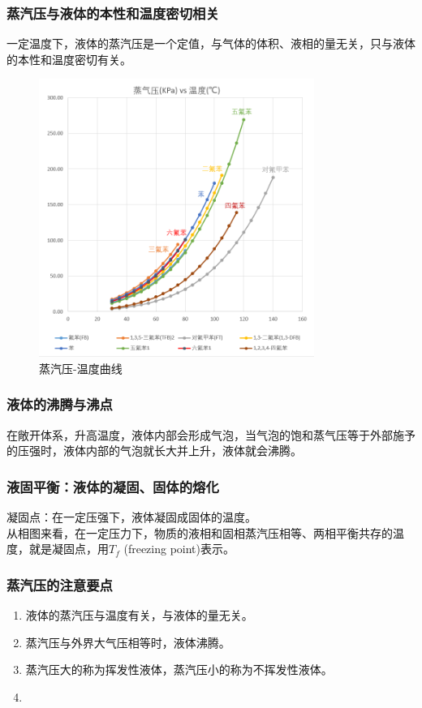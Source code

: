 \documentclass[12pt, a4paper, oneside]{ctexbook}
\begin{document}
\subsubsection*{蒸汽压与液体的本性和温度密切相关}
一定温度下，液体的蒸汽压是一个定值，与气体的体积、液相的量无关，只与液体的本性和温度密切有关。
\begin{figure}[htbp]
    \centering
    \includegraphics[width=0.8\textwidth]{pics/vapor_pressure.png}
    \caption{蒸汽压-温度曲线}
\end{figure}

\newpage
\subsubsection{液体的沸腾与沸点}
在敞开体系，升高温度，液体内部会形成气泡，当气泡的饱和蒸气压等于外部施予的压强时，液体内部的气泡就长大并上升，液体就会沸腾。\\
\subsubsection{液固平衡：液体的凝固、固体的熔化}
凝固点：在一定压强下，液体凝固成固体的温度。\\
从相图来看，在一定压力下，物质的液相和固相蒸汽压相等、两相平衡共存的温度，就是凝固点，用$T_f$ (freezing point)表示。\\

\subsubsection{蒸汽压的注意要点}
\begin{enumerate}
    \item 液体的蒸汽压与温度有关，与液体的量无关。
    \item 蒸汽压与外界大气压相等时，液体沸腾。
    \item 蒸汽压大的称为挥发性液体，蒸汽压小的称为不挥发性液体。
    \item 
\end{enumerate}
\end{document}
